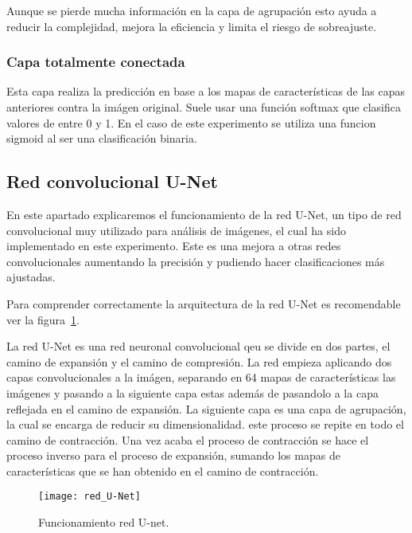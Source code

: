 Aunque se pierde mucha información en la capa de agrupación esto ayuda a reducir la complejidad, mejora la eficiencia y limita el riesgo de sobreajuste. 

\subsubsection{Capa totalmente conectada}
Esta capa realiza la predicción en base a los mapas de características de las capas anteriores contra la imágen original. Suele usar una función softmax que clasifica valores de entre 0 y 1. En el caso de este experimento se utiliza una funcion sigmoid al ser una clasificación binaria.

\subsection{Red convolucional U-Net}
En este apartado explicaremos el funcionamiento de la red U-Net, un tipo de red convolucional muy utilizado para análisis de imágenes, el cual ha sido implementado en este experimento. Este es una mejora a otras redes convolucionales aumentando la precisión y pudiendo hacer clasificaciones más ajustadas.

Para comprender correctamente la arquitectura de la red U-Net\cite{Unet} es recomendable ver la figura~\ref{fig:red_U-Net}.

La red U-Net es una red neuronal convolucional qeu se divide en dos partes, el camino de expansión y el camino de compresión. La red empieza aplicando dos capas convolucionales a la imágen, separando en 64 mapas de características las imágenes y pasando a la siguiente capa estas además de pasandolo a la capa reflejada en el camino de expansión. La siguiente capa es una capa de agrupación, la cual se encarga de reducir su dimensionalidad. este proceso se repite en todo el camino de contracción. Una vez acaba el proceso de contracción se hace el proceso inverso para el proceso de expansión, sumando los mapas de características que se han obtenido en el camino de contracción.

\begin{figure}[H]
	\centering
	\texttt{[image: red\_U-Net]}
	\caption[Funcionamiento red U-net.]{Funcionamiento red U-net\cite{Unet}.}
	\label{fig:red_U-Net}
\end{figure}

